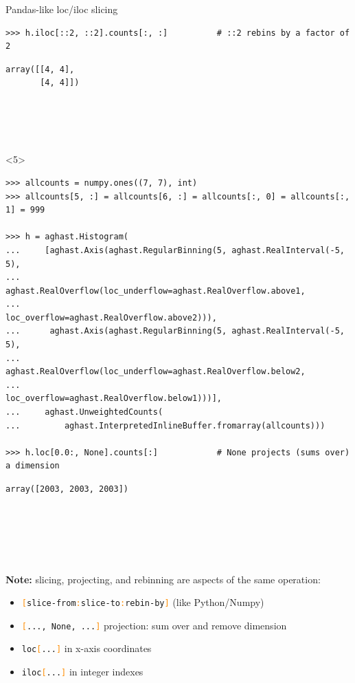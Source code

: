 \documentclass[aspectratio=169]{beamer}
\begin{document}
\begin{frame}[fragile]{Pandas-like loc/iloc slicing}
\begin{onlyenv}
\begin{verbatim}
>>> h.iloc[::2, ::2].counts[:, :]          # ::2 rebins by a factor of 2
\end{verbatim}
\begin{verbatim}
array([[4, 4],
       [4, 4]])





\end{verbatim}
\end{onlyenv}
\begin{onlyenv}<5>
\begin{verbatim}
>>> allcounts = numpy.ones((7, 7), int)
>>> allcounts[5, :] = allcounts[6, :] = allcounts[:, 0] = allcounts[:, 1] = 999

>>> h = aghast.Histogram(
...     [aghast.Axis(aghast.RegularBinning(5, aghast.RealInterval(-5, 5),
...                  aghast.RealOverflow(loc_underflow=aghast.RealOverflow.above1,
...                                      loc_overflow=aghast.RealOverflow.above2))),
...      aghast.Axis(aghast.RegularBinning(5, aghast.RealInterval(-5, 5),
...                  aghast.RealOverflow(loc_underflow=aghast.RealOverflow.below2,
...                                      loc_overflow=aghast.RealOverflow.below1)))],
...     aghast.UnweightedCounts(
...         aghast.InterpretedInlineBuffer.fromarray(allcounts)))

>>> h.loc[0.0:, None].counts[:]            # None projects (sums over) a dimension
\end{verbatim}
\begin{verbatim}
array([2003, 2003, 2003])






\end{verbatim}
\end{onlyenv}
\end{frame}

\begin{frame}{}
\vspace{1 cm}
\large
\begin{center}
{\bf Note:} slicing, projecting, and rebinning are aspects of the same operation:

\vspace{0.5 cm}
\begin{minipage}{0.9\linewidth}
\begin{itemize}
\item {\tt \textcolor{darkorange}{[}slice-from\textcolor{darkorange}{:}slice-to\textcolor{darkorange}{:}rebin-by\textcolor{darkorange}{]}} (like Python/Numpy)
\item {\tt \textcolor{darkorange}{[}..., None, ...\textcolor{darkorange}{]}} projection: sum over and remove dimension
\item {\tt loc\textcolor{darkorange}{[}...\textcolor{darkorange}{]}} in x-axis coordinates
\item {\tt iloc\textcolor{darkorange}{[}...\textcolor{darkorange}{]}} in integer indexes
\end{itemize}
\end{minipage}
\end{center}
\end{frame}
\end{document}

